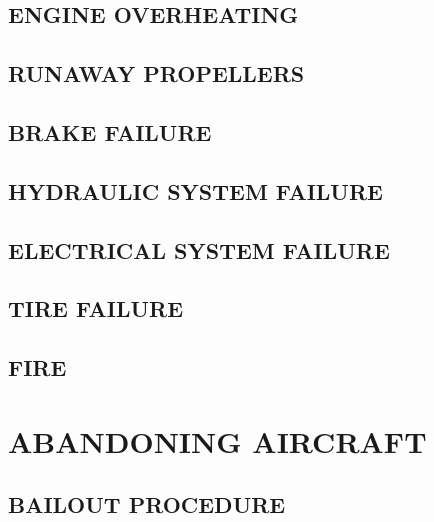 \subsection{ENGINE OVERHEATING}
\subsection{RUNAWAY PROPELLERS}
\subsection{BRAKE FAILURE}
\subsection{HYDRAULIC SYSTEM FAILURE}
\subsection{ELECTRICAL SYSTEM FAILURE}
\subsection{TIRE FAILURE}
\subsection{FIRE}


\section{ABANDONING AIRCRAFT}
\subsection{BAILOUT PROCEDURE}


\cleardoublepage{}